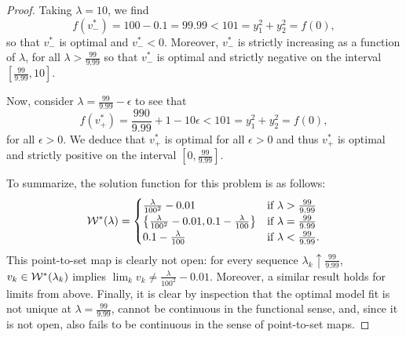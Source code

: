 \begin{proof}
    Taking \( \lambda = 10 \), we find
    \[
        f(v_-^*) = 100 - 0.1 = 99.99 < 101 = y_1^2 + y_2^2 = f(0),
    \]
    so that \( v_-^* \) is optimal and \( v_-^* < 0 \).
    Moreover, \( v_-^* \) is strictly increasing as a function of \( \lambda \),
    for all \( \lambda > \frac{99}{9.99} \)
    so that \( v_-^* \) is optimal and strictly negative on the interval
    \( [\frac{99}{9.99}, 10] \).

    Now, consider \( \lambda = \frac{99}{9.99} - \epsilon \) to see that
    \[
        f(v_+^*) = \frac{990}{9.99} + 1 - 10 \epsilon < 101 = y_1^2 + y_2^2 = f(0),
    \]
    for all \( \epsilon > 0 \).
    We deduce that \( v_+^* \) is optimal for all \( \epsilon > 0 \) and
    thus \( v_+^* \) is optimal and strictly positive on the interval
    \( [0, \frac{99}{9.99}] \).

    To summarize, the solution function for this problem is as follows:
    \[
        \mathcal{W}^*(\lambda) =
        \begin{cases}
            \frac{\lambda}{100^2} - 0.01
             & \mbox{if \( \lambda > \frac{99}{9.99} \)}  \\
            \left\{\frac{\lambda}{100^2} - 0.01, 0.1 - \frac{\lambda}{100}\right\}
             & \mbox{if \( \lambda = \frac{99}{9.99} \)}  \\
            0.1 - \frac{\lambda}{100}
             & \mbox{if \( \lambda < \frac{99}{9.99} \).}
        \end{cases}
    \]
    This point-to-set map is clearly not open:
    for every sequence \( \lambda_k \uparrow \frac{99}{9.99} \),
    \( v_k \in \mathcal{W}^*(\lambda_k) \) implies
    \( \lim_k v_k \neq \frac{\lambda}{100^2} - 0.01 \).
    Moreover, a similar result holds for limits from above.
    Finally, it is clear by inspection that the optimal model fit is not
    unique at \( \lambda = \frac{99}{9.99} \), cannot be continuous
    in the functional sense, and, since it is not open, also fails to be
    continuous in the sense of point-to-set maps.
\end{proof}

